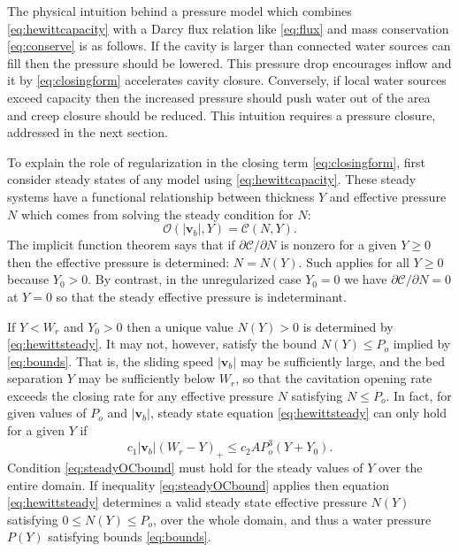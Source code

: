\documentclass[11pt,final]{amsart}%
\newcommand\bv{\mathbf{v}}
\begin{document}
The physical intuition behind a pressure model which combines \eqref{eq:hewittcapacity} with a Darcy flux relation like \eqref{eq:flux} and mass conservation \eqref{eq:conserve} is as follows.  If the cavity is larger than connected water sources can fill then the pressure should be lowered.  This pressure drop encourages inflow and it by \eqref{eq:closingform} accelerates cavity closure.  Conversely, if local water sources exceed capacity then the increased pressure should push water out of the area and creep closure should be reduced.  This intuition requires a pressure closure, addressed in the next section.

To explain the role of regularization in the closing term \eqref{eq:closingform}, first consider steady states of any model using \eqref{eq:hewittcapacity}.  These steady systems have a functional relationship between thickness $Y$ and effective pressure $N$ which comes from solving the steady condition for $N$:
\begin{equation}
\mathcal{O}(|\bv_b|,Y) = \mathcal{C}(N,Y). \label{eq:hewittsteady}
\end{equation}
The implicit function theorem says that if $\partial\mathcal{C}/\partial N$ is nonzero for a given $Y\ge 0$ then the effective pressure is determined: $N=N(Y)$.  Such applies for all $Y\ge 0$ because $Y_0>0$.  By contrast, in the unregularized case $Y_0=0$ we have $\partial\mathcal{C}/\partial N=0$ at $Y=0$ so that the steady effective pressure is indeterminant.

If $Y<W_r$ and $Y_0>0$ then a unique value $N(Y)>0$ is determined by \eqref{eq:hewittsteady}.  It may not, however, satisfy the bound $N(Y) \le P_o$ implied by \eqref{eq:bounds}.  That is, the sliding speed $|\bv_b|$ may be sufficiently large, and the bed separation $Y$ may be sufficiently below $W_r$, so that the cavitation opening rate exceeds the closing rate for any effective pressure $N$ satisfying $N\le P_o$.  In fact, for given values of $P_o$ and $|\bv_b|$, steady state equation \eqref{eq:hewittsteady} can only hold for a given $Y$ if
\begin{equation}
c_1 |\bv_b| (W_r - Y)_+ \le c_2 A P_o^3 (Y+Y_0). \label{eq:steadyOCbound}
\end{equation}
Condition \eqref{eq:steadyOCbound} must hold for the steady values of $Y$ over the entire domain.  If inequality \eqref{eq:steadyOCbound} applies then equation \eqref{eq:hewittsteady} determines a valid steady state effective pressure $N(Y)$ satisfying $0\le N(Y) \le P_o$, over the whole domain, and thus a water pressure $P(Y)$ satisfying bounds \eqref{eq:bounds}.  
\end{document}
